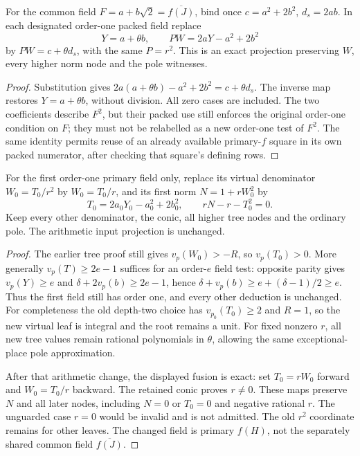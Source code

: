 \begin{lemma}
\label{lem:quartic-shared-field-square}
For the common field $F=a+b\sqrt2=\overline{f(J)}$, bind once
$c=a^2+2b^2$, $d_s=2ab$. In each designated order-one packed field replace
\[
 Y=a+\theta b,\qquad PW=2aY-a^2+2b^2
\]
by $PW=c+\theta d_s$, with the same $P=r^2$. This is an exact projection
preserving $W$, every higher norm node and the pole witnesses.
\end{lemma}
\begin{proof}
Substitution gives $2a(a+\theta b)-a^2+2b^2=c+\theta d_s$.
The inverse map restores $Y=a+\theta b$, without division. All zero
cases are included. The two coefficients describe $F^2$, but their
packed use still enforces the original order-one condition on $F$;
they must not be relabelled as a new order-one test of $F^2$. The same
identity permits reuse of an already available primary-$f$ square in
its own packed numerator, after checking that square's defining rows.
\end{proof}



\begin{lemma}
\label{lem:quartic-first-norm-fusion}
For the first order-one primary field only, replace its virtual denominator
$W_0=T_0/r^2$ by $W_0=T_0/r$, and its first norm $N=1+rW_0^2$ by
\[
 T_0=2a_0Y_0-a_0^2+2b_0^2,\qquad rN-r-T_0^2=0.
\]
Keep every other denominator, the conic, all higher tree nodes and the
ordinary pole. The arithmetic input projection is unchanged.
\end{lemma}
\begin{proof}
The earlier tree proof still gives $v_p(W_0)>-R$, so $v_p(T_0)>0$.
More generally $v_p(T)\ge2e-1$ suffices for an order-$e$ field test:
opposite parity gives $v_p(Y)\ge e$ and
$\delta+2v_p(b)\ge2e-1$, hence
$\delta+v_p(b)\ge e+(\delta-1)/2\ge e$.
Thus the first field still has order one, and every other deduction is
unchanged. For completeness the old depth-two choice has $v_{p_0}(T_0)\ge2$
and $R=1$, so the new virtual leaf is integral and the root remains a unit.
For fixed nonzero $r$, all new tree values remain rational polynomials in
$\theta$, allowing the same exceptional-place pole approximation.

After that arithmetic change, the displayed fusion is exact: set
$T_0=rW_0$ forward and $W_0=T_0/r$ backward. The retained conic proves
$r\ne0$. These maps preserve $N$ and all later nodes, including $N=0$
or $T_0=0$ and negative rational $r$. The unguarded case $r=0$ would be
invalid and is not admitted. The old $r^2$ coordinate remains for other
leaves. The changed field is primary $f(H)$, not the separately shared
common field $\overline{f(J)}$.
\end{proof}


